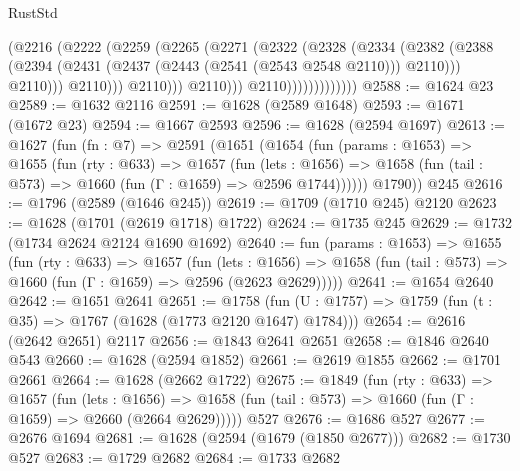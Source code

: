 \begin{lexlean}{RustStd}
\begin{coremodule}
                                  (@2216
                                    (@2222
                                      (@2259
                                        (@2265
                                          (@2271
                                            (@2322
                                              (@2328
                                                (@2334
                                                  (@2382
                                                    (@2388
                                                      (@2394
                                                        (@2431
                                                          (@2437
                                                            (@2443 (@2541 (@2543 @2548 @2110)))
                                                            @2110)))
                                                      @2110)))
                                                @2110)))
                                          @2110)))
                                    @2110)))
                              @2110)))))))))))))
@2588 := @1624 @23
@2589 := @1632 @2116
@2591 := @1628 (@2589 @1648)
@2593 := @1671 (@1672 @23)
@2594 := @1667 @2593
@2596 := @1628 (@2594 @1697)
@2613 := @1627
    (fun (fn : @7) =>
    @2591
      (@1651
        (@1654
          (fun (params : @1653) =>
          @1655
            (fun (rty : @633) =>
            @1657
              (fun (lets : @1656) =>
              @1658 (fun (tail : @573) => @1660 (fun (Γ : @1659) => @2596 @1744))))))
        @1790))
    @245
@2616 := @1796 (@2589 (@1646 @245))
@2619 := @1709 (@1710 @245) @2120
@2623 := @1628 (@1701 (@2619 @1718) @1722)
@2624 := @1735 @245
@2629 := @1732 (@1734 @2624 @2124 @1690 @1692)
@2640 := fun (params : @1653) =>
  @1655
    (fun (rty : @633) =>
    @1657
      (fun (lets : @1656) =>
      @1658 (fun (tail : @573) => @1660 (fun (Γ : @1659) => @2596 (@2623 @2629)))))
@2641 := @1654 @2640
@2642 := @1651 @2641
@2651 := @1758 (fun (U : @1757) => @1759 (fun (t : @35) => @1767 (@1628 (@1773 @2120 @1647) @1784)))
@2654 := @2616 (@2642 @2651) @2117
@2656 := @1843 @2641 @2651
@2658 := @1846 @2640 @543
@2660 := @1628 (@2594 @1852)
@2661 := @2619 @1855
@2662 := @1701 @2661
@2664 := @1628 (@2662 @1722)
@2675 := @1849
    (fun (rty : @633) =>
    @1657
      (fun (lets : @1656) =>
      @1658 (fun (tail : @573) => @1660 (fun (Γ : @1659) => @2660 (@2664 @2629)))))
    @527
@2676 := @1686 @527
@2677 := @2676 @1694
@2681 := @1628 (@2594 (@1679 (@1850 @2677)))
@2682 := @1730 @527
@2683 := @1729 @2682
@2684 := @1733 @2682

\end{coremodule}
\end{lexlean}
